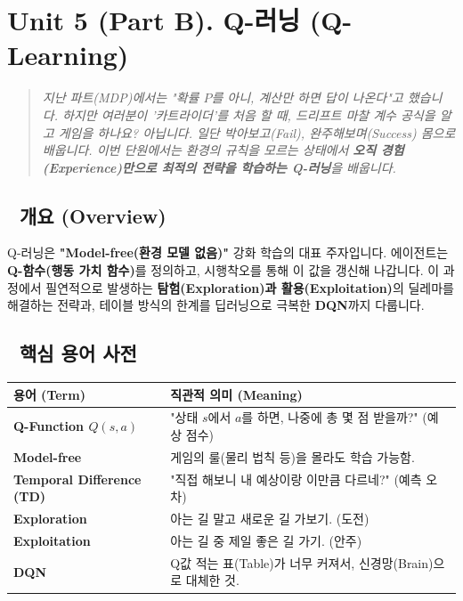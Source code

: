 \documentclass[11pt,a4paper]{book}
\theoremstyle{definition}
\begin{document}
\section{Unit 5 (Part B). Q-러닝 (Q-Learning)}

\begin{quote}
\textit{지난 파트(MDP)에서는 "확률 $P$를 아니, 계산만 하면 답이 나온다"고 했습니다. 하지만 여러분이 '카트라이더'를 처음 할 때, 드리프트 마찰 계수 공식을 알고 게임을 하나요? 아닙니다. 일단 박아보고(Fail), 완주해보며(Success) 몸으로 배웁니다. 이번 단원에서는 환경의 규칙을 모르는 상태에서 \textbf{오직 경험(Experience)만으로 최적의 전략을 학습하는 Q-러닝}을 배웁니다.}
\end{quote}

\subsection*{📌 개요 (Overview)}
Q-러닝은 \textbf{"Model-free(환경 모델 없음)"} 강화 학습의 대표 주자입니다. 에이전트는 \textbf{Q-함수(행동 가치 함수)}를 정의하고, 시행착오를 통해 이 값을 갱신해 나갑니다. 이 과정에서 필연적으로 발생하는 \textbf{탐험(Exploration)과 활용(Exploitation)}의 딜레마를 해결하는 전략과, 테이블 방식의 한계를 딥러닝으로 극복한 \textbf{DQN}까지 다룹니다.

\subsection*{📝 핵심 용어 사전}
\begin{table}[h]
\centering
\begin{tabularx}{\textwidth}{|p{}|X|}
\hline
\textbf{용어 (Term)} & \textbf{직관적 의미 (Meaning)} \\
\hline
\textbf{Q-Function $Q(s, a)$} & "상태 $s$에서 $a$를 하면, 나중에 총 몇 점 받을까?" (예상 점수) \\
\hline
\textbf{Model-free} & 게임의 룰(물리 법칙 등)을 몰라도 학습 가능함. \\
\hline
\textbf{Temporal Difference (TD)} & "직접 해보니 내 예상이랑 이만큼 다르네?" (예측 오차) \\
\hline
\textbf{Exploration} & 아는 길 말고 새로운 길 가보기. (도전) \\
\hline
\textbf{Exploitation} & 아는 길 중 제일 좋은 길 가기. (안주) \\
\hline
\textbf{DQN} & Q값 적는 표(Table)가 너무 커져서, 신경망(Brain)으로 대체한 것. \\
\hline
\end{tabularx}
\end{table}
\end{document}
